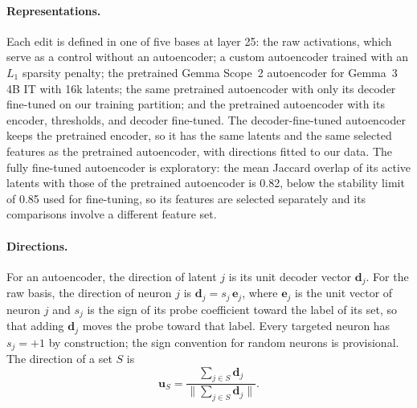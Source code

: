 \paragraph{Representations.} Each edit is defined in one of five bases at
layer 25: the raw activations, which serve as a control without an
autoencoder; a custom autoencoder trained with an $L_1$ sparsity penalty; the
pretrained Gemma Scope~2 autoencoder for Gemma~3 4B IT with 16k latents; the
same pretrained autoencoder with only its decoder fine-tuned on our training
partition; and the pretrained autoencoder with its encoder, thresholds, and
decoder fine-tuned. The decoder-fine-tuned autoencoder keeps the pretrained
encoder, so it has the same latents and the same selected features as the
pretrained autoencoder, with directions fitted to our data. The fully
fine-tuned autoencoder is exploratory: the mean Jaccard overlap of its active
latents with those of the pretrained autoencoder is 0.82, below the stability
limit of 0.85 used for fine-tuning, so its features are selected separately
and its comparisons involve a different feature set.

\paragraph{Directions.} For an autoencoder, the direction of latent $j$ is its
unit decoder vector $\mathbf{d}_j$. For the raw basis, the direction of neuron
$j$ is $\mathbf{d}_j = s_j\,\mathbf{e}_j$, where $\mathbf{e}_j$ is the unit
vector of neuron $j$ and $s_j$ is the sign of its probe coefficient toward the
label of its set, so that adding $\mathbf{d}_j$ moves the probe toward that
label. Every targeted neuron has $s_j = +1$ by construction; the sign
convention for random neurons is provisional. The direction of a set $S$ is
\begin{equation}
  \mathbf{u}_S = \frac{\sum_{j \in S} \mathbf{d}_j}
  {\bigl\|\sum_{j \in S} \mathbf{d}_j\bigr\|}.
  \label{eq:set-direction}
\end{equation}

